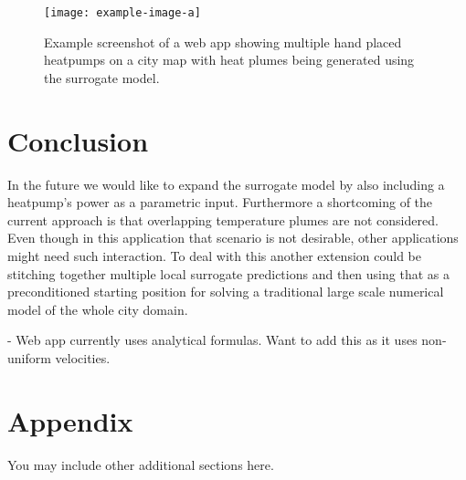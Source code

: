 \documentclass{article} %
\begin{document}
\begin{figure}[htb]
   \centering
   \texttt{[image: example-image-a]}
   \caption{Example screenshot of a web app showing multiple hand placed heatpumps on a city map with heat plumes being generated using the surrogate model.}
\end{figure}

\section{Conclusion}
\label{sec:conclusion}




In the future we would like to expand the surrogate model by also including a heatpump's power as a parametric input.
Furthermore a shortcoming of the current approach is that overlapping temperature plumes are not considered.
Even though in this application that scenario is not desirable, other applications might need such interaction.
To deal with this another extension could be stitching together multiple local surrogate predictions and then using that as a preconditioned starting position for solving a traditional large scale numerical model of the whole city domain.

- Web app currently uses analytical formulas. Want to add this as it uses non-uniform velocities.

%




\appendix
\section{Appendix}
You may include other additional sections here.
\end{document}
